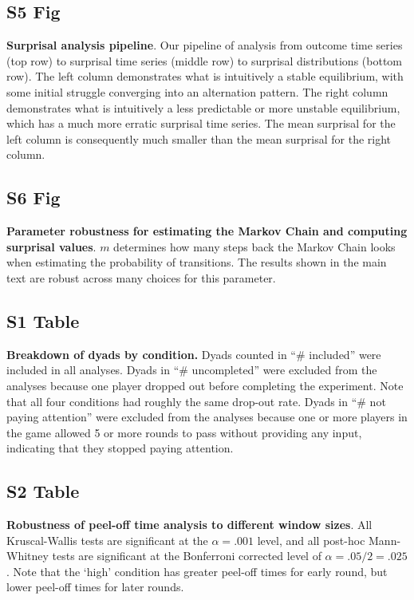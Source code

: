 \documentclass[10pt,letterpaper]{article}
\begin{document}
\subsection*{S5 Fig}
\label{S5_Fig}
{\bf Surprisal analysis pipeline}. Our pipeline of analysis from outcome time series (top row) to surprisal time series (middle row) to surprisal distributions (bottom row). The left column demonstrates what is intuitively a stable equilibrium, with some initial struggle converging into an alternation pattern. The right column demonstrates what is intuitively a less predictable or more unstable equilibrium, which has a much more erratic surprisal time series. The mean surprisal for the left column is consequently much smaller than the mean surprisal for the right column.

\subsection*{S6 Fig}
\label{S6_Fig}
{\bf Parameter robustness for estimating the Markov Chain and computing surprisal values}. $m$ determines how many steps back the Markov Chain looks when estimating the probability of transitions. The results shown in the main text are robust across many choices for this parameter.

\subsection*{S1 Table}
\label{S1_Table}
{\bf Breakdown of dyads by condition.} Dyads counted in ``\# included'' were included in all analyses. Dyads in ``\# uncompleted'' were excluded from the analyses because one player dropped out before completing the experiment. Note that all four conditions had roughly the same drop-out rate. Dyads in ``\# not paying attention'' were excluded from the analyses because one or more players in the game allowed 5 or more rounds to pass without providing any input, indicating that they stopped paying attention.

\subsection*{S2 Table}
\label{S2_Table}
{\bf Robustness of peel-off time analysis to different window sizes}. All Kruscal-Wallis tests are significant at the $\alpha = .001$ level, and all post-hoc Mann-Whitney tests are significant at the Bonferroni corrected level of $\alpha = .05/2 = .025$. Note that the `high' condition has greater peel-off times for early round, but lower peel-off times for later rounds.
 
\end{document}
